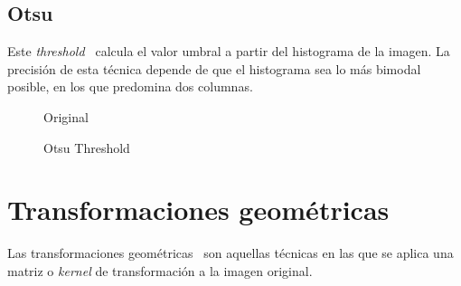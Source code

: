 \subsection{Otsu}\label{tecnica:threshold-otsu}
Este \emph{threshold}\emph{~\citep*[A threshold selection method from
  gray-level histograms]{otsu1975threshold}} calcula el valor umbral a
partir del histograma de la imagen. La precisión de esta técnica
depende de que el histograma sea lo más bimodal posible, en los que
predomina dos columnas.

\begin{figure}[H]
  \caption{Original}
  \centering \setlength\fboxsep{0pt} \setlength\fboxrule{0.5pt}
\end{figure}

\begin{figure}[H]
  \centering \setlength\fboxsep{0pt} \setlength\fboxrule{0.5pt}
  \caption{Otsu Threshold}
\end{figure}

\section{Transformaciones geométricas}
Las transformaciones geométricas~\emph{\citep*[Stretch, Shrink, Warp,
  and Rotate]{opencv_book-bib}} son aquellas técnicas en las que se
aplica una matriz o \emph{kernel} de transformación a la imagen
original.
